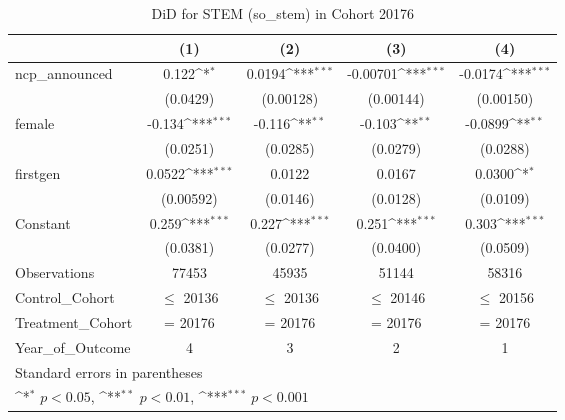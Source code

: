 \begin{table}[htbp]\centering
\def\sym#1{\ifmmode^{#1}\else\(^{#1}\)\fi}
\caption{DiD for STEM (so\_stem) in Cohort 20176}
\begin{tabular}{l*{4}{c}}
\toprule
                &\multicolumn{1}{c}{(1)}         &\multicolumn{1}{c}{(2)}         &\multicolumn{1}{c}{(3)}         &\multicolumn{1}{c}{(4)}         \\
\midrule
ncp\_announced   &    0.122\sym{*}  &   0.0194\sym{***}& -0.00701\sym{***}&  -0.0174\sym{***}\\
                & (0.0429)         &(0.00128)         &(0.00144)         &(0.00150)         \\
\addlinespace
female          &   -0.134\sym{***}&   -0.116\sym{**} &   -0.103\sym{**} &  -0.0899\sym{**} \\
                & (0.0251)         & (0.0285)         & (0.0279)         & (0.0288)         \\
\addlinespace
firstgen        &   0.0522\sym{***}&   0.0122         &   0.0167         &   0.0300\sym{*}  \\
                &(0.00592)         & (0.0146)         & (0.0128)         & (0.0109)         \\
\addlinespace
Constant        &    0.259\sym{***}&    0.227\sym{***}&    0.251\sym{***}&    0.303\sym{***}\\
                & (0.0381)         & (0.0277)         & (0.0400)         & (0.0509)         \\
\midrule
Observations    &    77453         &    45935         &    51144         &    58316         \\
Control\_Cohort  &$\le$ 20136         &$\le$ 20136         &$\le$ 20146         &$\le$ 20156         \\
Treatment\_Cohort&  = 20176         &  = 20176         &  = 20176         &  = 20176         \\
Year\_of\_Outcome &        4         &        3         &        2         &        1         \\
\bottomrule
\multicolumn{5}{l}{\footnotesize Standard errors in parentheses}\\
\multicolumn{5}{l}{\footnotesize \sym{*} \(p<0.05\), \sym{**} \(p<0.01\), \sym{***} \(p<0.001\)}\\
\end{tabular}
\end{table}
